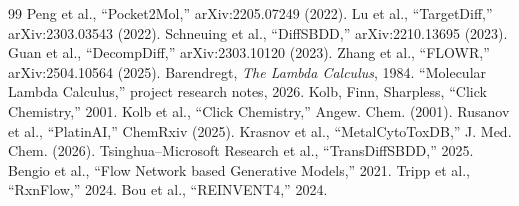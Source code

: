 \documentclass{article}
\begin{document}
\begin{thebibliography}{99}
 Peng et al., ``Pocket2Mol,'' arXiv:2205.07249 (2022).
 Lu et al., ``TargetDiff,'' arXiv:2303.03543 (2022).
 Schneuing et al., ``DiffSBDD,'' arXiv:2210.13695 (2023).
 Guan et al., ``DecompDiff,'' arXiv:2303.10120 (2023).
 Zhang et al., ``FLOWR,'' arXiv:2504.10564 (2025).
 Barendregt, \emph{The Lambda Calculus}, 1984.
 ``Molecular Lambda Calculus,'' project research notes, 2026.
 Kolb, Finn, Sharpless, ``Click Chemistry,'' 2001.
 Kolb et al., ``Click Chemistry,'' Angew. Chem. (2001).
 Rusanov et al., ``PlatinAI,'' ChemRxiv (2025).
 Krasnov et al., ``MetalCytoToxDB,'' J. Med. Chem. (2026).
 Tsinghua--Microsoft Research et al., ``TransDiffSBDD,'' 2025.
 Bengio et al., ``Flow Network based Generative Models,'' 2021.
 Tripp et al., ``RxnFlow,'' 2024.
 Bou et al., ``REINVENT4,'' 2024.
\end{thebibliography}
\end{document}
